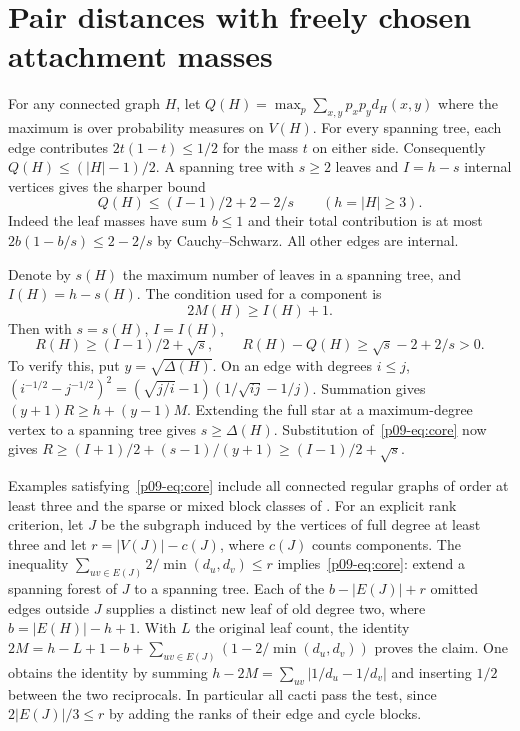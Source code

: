 \documentclass[11pt,a4paper]{article}
\begin{document}
\section{Pair distances with freely chosen attachment masses}
For any connected graph $H$, let $Q(H)=\max_p\sum_{x,y}p_xp_y d_H(x,y)$
where the maximum is over probability measures on $V(H)$. For every
spanning tree, each edge contributes $2t(1-t)\le1/2$ for the mass $t$
on either side. Consequently $Q(H)\le(|H|-1)/2$.
A spanning tree with $s\ge2$ leaves and $I=h-s$ internal vertices gives
the sharper bound
\[
 Q(H)\le (I-1)/2+2-2/s\qquad (h=|H|\ge3).
\]
Indeed the leaf masses have sum $b\le1$ and their total contribution is at
most $2b(1-b/s)\le2-2/s$ by Cauchy--Schwarz. All other edges are internal.

Denote by $s(H)$ the maximum number of leaves in a spanning tree, and
$I(H)=h-s(H)$. The condition used for a component is
\begin{equation}\label{p09-eq:core}
           2M(H)\ge I(H)+1 .
\end{equation}
Then with $s=s(H)$, $I=I(H)$,
\begin{equation}\label{p09-eq:score}
 R(H)\ge (I-1)/2+\sqrt s,\qquad
 R(H)-Q(H)\ge\sqrt s-2+2/s>0 .
\end{equation}
To verify this, put $y=\sqrt{\Delta(H)}$. On an edge with degrees
$i\le j$, $(i^{-1/2}-j^{-1/2})^2=(\sqrt{j/i}-1)(1/\sqrt{ij}-1/j)$.
Summation gives $(y+1)R\ge h+(y-1)M$. Extending the full star at a
maximum-degree vertex to a spanning tree gives $s\ge\Delta(H)$.
Substitution of~\eqref{p09-eq:core} now gives
$R\ge(I+1)/2+(s-1)/(y+1)\ge(I-1)/2+\sqrt s$.

Examples satisfying~\eqref{p09-eq:core} include all connected regular graphs
of order at least three and the sparse or mixed block classes of
\cite[Section 4]{p09-Prev}. For an explicit rank criterion, let $J$ be the
subgraph induced by the vertices of full degree at least three and let
$r=|V(J)|-c(J)$, where $c(J)$ counts components. The inequality
$\sum_{uv\in E(J)}2/\min(d_u,d_v)\le r$ implies~\eqref{p09-eq:core}:
extend a spanning forest of $J$ to a spanning tree. Each of the
$b-|E(J)|+r$ omitted edges outside $J$ supplies a distinct new leaf
of old degree two, where $b=|E(H)|-h+1$. With $L$ the original leaf
count, the identity $2M=h-L+1-b+
\sum_{uv\in E(J)}(1-2/\min(d_u,d_v))$ proves the claim. One obtains
the identity by summing $h-2M=\sum_{uv}|1/d_u-1/d_v|$ and inserting
$1/2$ between the two reciprocals. In particular all cacti pass the test,
since $2|E(J)|/3\le r$ by adding the ranks of their edge and cycle blocks.
\end{document}
